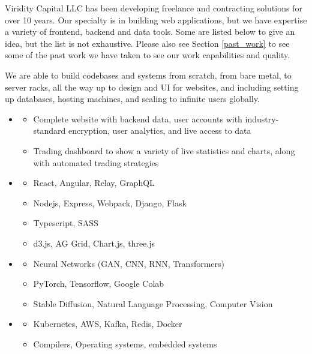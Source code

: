 Viridity Capital LLC has been developing freelance and contracting solutions
for over 10 years. Our specialty is in building web applications, but we have
expertise a variety of frontend, backend and data tools. Some are listed below
to give an idea, but the list is not exhaustive. Please also see Section
\ref{past_work} to see some of the past work we have taken to see our work
capabilities and quality.

We are able to build codebases and systems from scratch, from bare metal, to
server racks, all the way up to design and UI for websites, and including
setting up databases, hosting machines, and scaling to infinite users globally.

\begin{itemize}
  \item {}
  \begin{itemize}
    \item Complete website with backend data, user accounts with
      industry-standard encryption, user analytics, and live access to data
    \item Trading dashboard to show a variety of live statistics and charts,
      along with automated trading strategies
  \end{itemize}
  \item {}
  \begin{itemize}
    \item React, Angular, Relay, GraphQL
    \item Nodejs, Express, Webpack, Django, Flask
    \item Typescript, SASS
    \item d3.js, AG Grid, Chart.js, three.js
  \end{itemize}
  \item {}
  \begin{itemize}
    \item Neural Networks (GAN, CNN, RNN, Transformers)
    \item PyTorch, Tensorflow, Google Colab
    \item Stable Diffusion, Natural Language Processing, Computer Vision
  \end{itemize}
  \item {}
  \begin{itemize}
    \item Kubernetes, AWS, Kafka, Redis, Docker
    \item Compilers, Operating systems, embedded systems

\end{itemize}
\end{itemize}
